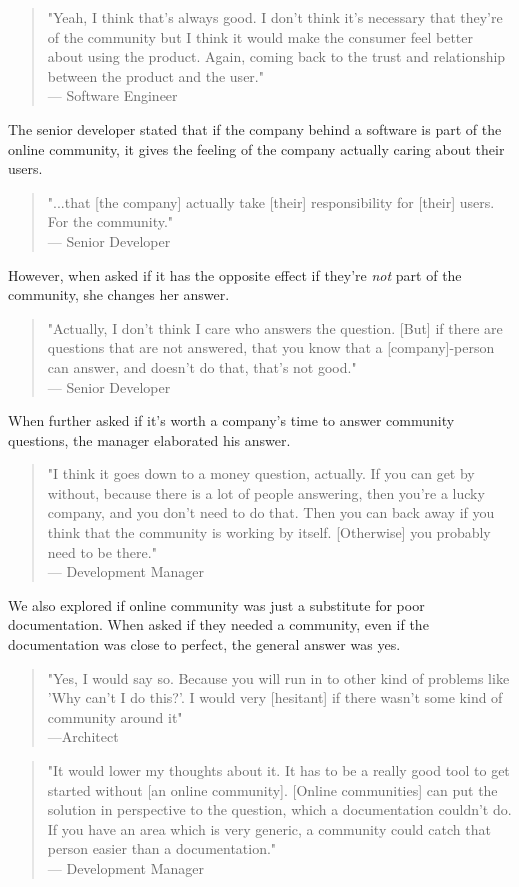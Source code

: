 \documentclass{article}
\begin{document}
\begin{quote}
"Yeah, I think that's always good. I don't think it's necessary that they're of the community but I think it would make the consumer feel better about using the product. Again, coming back to the trust and relationship between the product and the user."\\--- Software Engineer
\end{quote}
The senior developer stated that if the company behind a software is part of the online community, it gives the feeling of the company actually caring about their users.
\begin{quote}
"...that [the company] actually take [their] responsibility for [their] users. For the community." \\--- Senior Developer
\end{quote}
However, when asked if it has the opposite effect if they're \textit{not} part of the community, she changes her answer.
\begin{quote}
"Actually, I don't think I care who answers the question. [But] if there are questions that are not answered, that you know that a [company]-person can answer, and doesn't do that, that's not good."\\--- Senior Developer
\end{quote}
When further asked if it's worth a company's time to answer community questions, the manager elaborated his answer.
\begin{quote}
"I think it goes down to a money question, actually. If you can get by without, because there is a lot of people answering, then  you're a lucky company, and you don't need to do that. Then you can back away if you think that the community is working by itself. [Otherwise] you probably need to be there."\\--- Development Manager
\end{quote}
We also explored if online community was just a substitute for poor documentation. When asked if they needed a community, even if the documentation was close to perfect, the general answer was yes.
\begin{quote}
"Yes, I would say so. Because you will run in to other kind of problems like 'Why can't I do this?'. I would very [hesitant] if there wasn't some kind of community around it"\\---Architect
\end{quote}
\begin{quote}
"It would lower my thoughts about it. It has to be a really good tool to get started without [an online community]. [Online communities] can put the solution in perspective to the question, which a documentation couldn't do. If you have an area which is very generic, a community could catch that person easier than a documentation."\\--- Development Manager
\end{quote}
\end{document}
